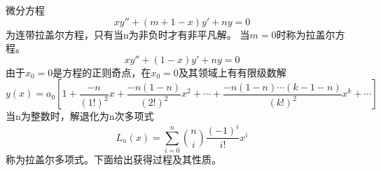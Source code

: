 	微分方程
	\begin{equation}
		x y''  + (m + 1 -x) y' +n y =0
	\end{equation}
	为连带拉盖尔方程，只有当n为非负时才有非平凡解。
	当$m =0$时称为拉盖尔方程。
	\begin{equation}
		x y''  + (1 -x) y' +n y =0
	\end{equation}
	由于$x_0=0$是方程的正则奇点，在$x_0=0$及其领域上有有限级数解
	\begin{equation}
		y(x)=a_{0}\left[1+\frac{-n}{(1!)^{2}} x+\frac{-n(1-n)}{(2!)^{2}} x^{2}+\cdots+\frac{-n(1-n) \cdots(k-1-n)}{(k!)^{2}} x^{k}+\cdots\right]
	\end{equation}
	当n为整数时，解退化为n次多项式
	\begin{equation}
		L_{n}(x)=\sum_{i=0}^{n}\binom{n}{i} \frac{(-1)^{i}}{i!} x^{i}
	\end{equation}
	称为拉盖尔多项式。下面给出获得过程及其性质。

